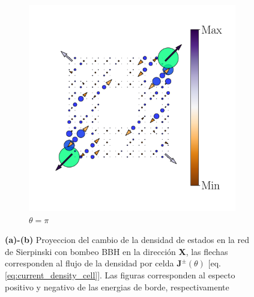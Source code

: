 \begin{figure}[tbh!]
\begin{minipage}[h!]{1.0\textwidth}
\begin{subfigure}[b!]{0.2 \textwidth}
         \end{subfigure}\hspace*{-0.5em}
          \begin{subfigure}[b!]{0.2 \textwidth}
             \caption*{$\theta = \pi$}
             \includegraphics[width=\textwidth]{Imagenes/Resultados_pump_Fractal/x/hoti_pomp_x_neg5.pdf}
         \end{subfigure}\hspace*{-0.5em}
     \end{minipage}
     
    
     
     
    \caption{\textbf{(a)-(b)} Proyeccion del cambio de la densidad de estados en la red de Sierpinski con bombeo BBH en la dirección \textbf{X}, las flechas corresponden al flujo de la densidad por celda $\mathbf{J}^{\pm}(\theta)$ [eq. \ref{eq:current_density_cell}]. Las figuras corresponden al especto positivo y negativo de las energias de borde, respectivamente}
    \label{fig:Proy_pump_fractal_x}
\end{figure}